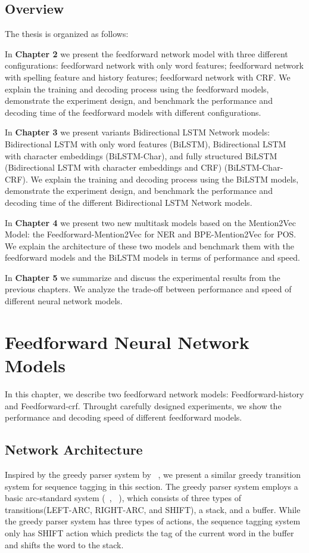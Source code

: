 \documentclass{sfuthesis}
\begin{document}
\section{Overview}
The thesis is organized as follows:

In \textbf{Chapter 2}  we present the feedforward network model with three different configurations: feedforward network with only word features; feedforward network with spelling feature and history features; feedforward network with CRF. We explain the training and decoding process using the feedforward models, demonstrate the experiment design, and benchmark the performance and decoding time of the feedforward models with different configurations.

In \textbf{Chapter 3} we present variants Bidirectional LSTM Network models: Bidirectional LSTM with only word features (BiLSTM), Bidirectional LSTM with character embeddings (BiLSTM-Char), and fully structured BiLSTM (Bidirectional LSTM with character embeddings and CRF) (BiLSTM-Char-CRF). We explain the training and decoding process using the BiLSTM models, demonstrate the experiment design, and benchmark the performance and decoding time of the different Bidirectional LSTM Network models.

In \textbf{Chapter 4} we present two new multitask models based on the Mention2Vec Model: the Feedforward-Mention2Vec for NER and BPE-Mention2Vec for POS. We explain the architecture of these two models and benchmark them with the feedforward models and the BiLSTM models in terms of performance and speed.

In \textbf{Chapter 5} we summarize and discuss the experimental results from the previous chapters. We analyze the trade-off between performance and speed of different neural network models.


\chapter{Feedforward Neural Network Models}

In this chapter, we describe two feedforward network models: Feedforward-history and Feedforward-crf. Throught carefully designed experiments, we show the performance and decoding speed of different feedforward models.

\section{Network Architecture}
Inspired by the greedy parser system by ~\cite{chen2014fast}, we present a similar greedy transition system for sequence tagging in this section. The greedy parser system employs a basic arc-standard system (~\citeauthor{nivre2004deterministic}, ~\citeyear{nivre2004deterministic}), which consists of three types of transitions(LEFT-ARC, RIGHT-ARC, and SHIFT), a stack, and a buffer. While the greedy parser system has three types of actions, the sequence tagging system only has SHIFT action which predicts the tag of the current word in the buffer and shifts the word to the stack. 
\end{document}
